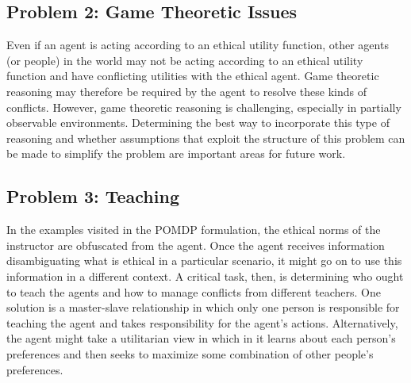 \documentclass[11pt]{article}
\begin{document}
{\subsection{Problem 2: Game Theoretic Issues} Even if an agent is acting according to an ethical utility function, other agents (or people) in the world may not be acting according to an ethical utility function and have conflicting utilities with the ethical agent. Game theoretic reasoning may therefore be required by the agent to resolve these kinds of conflicts. However, game theoretic reasoning is challenging, especially in partially observable environments. Determining the best way to incorporate this type of reasoning and whether assumptions that exploit the structure of this problem can be made to simplify the problem are important areas for future work.


\subsection{Problem 3: Teaching} In the examples visited in the POMDP formulation, the ethical norms of the instructor are obfuscated from the agent. Once the agent receives information disambiguating what is ethical in a particular scenario, it might go on to use this information in a different context. %
A critical task, then, is determining who ought to teach the agents and how to manage conflicts from different teachers. One solution is a master-slave relationship in which only one person is responsible for teaching the agent and takes responsibility for the agent's actions. Alternatively, the agent might take a utilitarian view in which in it learns about each person's preferences and then seeks to maximize some combination of other people's preferences.

}
\end{document}
